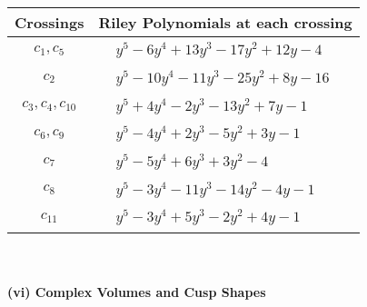 \documentclass[1p]{elsarticle_modified}
\theoremstyle{definition}
\begin{document}
\begin{tabular}{m{50pt}|m{274pt}}
Crossings & \hspace{64pt}Riley Polynomials at each crossing \\
\hline $$\begin{aligned}c_{1},c_{5}\end{aligned}$$&$\begin{aligned}
&y^5-6 y^4+13 y^3-17 y^2+12 y-4
\end{aligned}$\\
\hline $$\begin{aligned}c_{2}\end{aligned}$$&$\begin{aligned}
&y^5-10 y^4-11 y^3-25 y^2+8 y-16
\end{aligned}$\\
\hline $$\begin{aligned}c_{3},c_{4},c_{10}\end{aligned}$$&$\begin{aligned}
&y^5+4 y^4-2 y^3-13 y^2+7 y-1
\end{aligned}$\\
\hline $$\begin{aligned}c_{6},c_{9}\end{aligned}$$&$\begin{aligned}
&y^5-4 y^4+2 y^3-5 y^2+3 y-1
\end{aligned}$\\
\hline $$\begin{aligned}c_{7}\end{aligned}$$&$\begin{aligned}
&y^5-5 y^4+6 y^3+3 y^2-4
\end{aligned}$\\
\hline $$\begin{aligned}c_{8}\end{aligned}$$&$\begin{aligned}
&y^5-3 y^4-11 y^3-14 y^2-4 y-1
\end{aligned}$\\
\hline $$\begin{aligned}c_{11}\end{aligned}$$&$\begin{aligned}
&y^5-3 y^4+5 y^3-2 y^2+4 y-1
\end{aligned}$\\
\hline
\end{tabular}\\~\\
\newpage\flushleft \textbf{(vi) Complex Volumes and Cusp Shapes}
\end{document}
